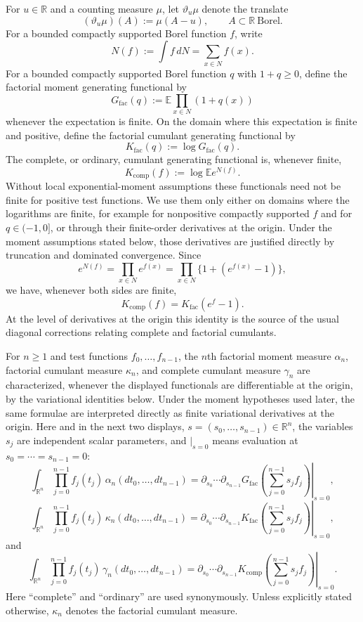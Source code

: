 \documentclass[aap,press]{apt} \volno{00} \partno{00}
\newcommand{\E}{\mathbb{E}}
\newcommand{\R}{\mathbb{R}}
\newcommand{\1}{\mathbf{1}}
\numberwithin{equation}{section}
\begin{document}
For $u\in\R$ and a counting measure $\mu$, let $\vartheta_u\mu$ denote the translate
\[
(\vartheta_u\mu)(A):=\mu(A-u),\qquad A\subset\R\ \text{Borel}.
\]
For a bounded compactly supported Borel function $f$, write
\[
N(f):=\int f\,dN = \sum_{x\in N}f(x) .
\]
For a bounded compactly supported Borel function $q$ with $1+q\ge0$, define the factorial moment generating functional by
\[
G_{\mathrm{fac}}(q)
:=
\E\prod_{x\in N}(1+q(x))
\]
whenever the expectation is finite. On the domain where this expectation is finite and positive, define the factorial cumulant generating functional by
\[
K_{\mathrm{fac}}(q)
:=
\log G_{\mathrm{fac}}(q).
\]
The complete, or ordinary, cumulant generating functional is, whenever finite,
\[
K_{\mathrm{comp}}(f)
:=
\log \E e^{N(f)} .
\]
Without local exponential-moment assumptions these functionals need not be finite for positive test functions. We use them only either on domains where the logarithms are finite, for example for nonpositive compactly supported $f$ and for $q\in(-1,0]$, or through their finite-order derivatives at the origin. Under the moment assumptions stated below, those derivatives are justified directly by truncation and dominated convergence.
Since
\[
e^{N(f)}=\prod_{x\in N} e^{f(x)}=\prod_{x\in N}\{1+(e^{f(x)}-1)\},
\]
we have, whenever both sides are finite,
\begin{equation}\label{eq:ordinary-factorial-generating-functional}
K_{\mathrm{comp}}(f)
=
K_{\mathrm{fac}}(e^f-1).
\end{equation}
At the level of derivatives at the origin this identity is the source of the usual diagonal corrections relating complete and factorial cumulants.

For $n\ge1$ and test functions $f_0,\ldots,f_{n-1}$, the $n$th factorial moment measure $\alpha_n$, factorial cumulant measure $\kappa_n$, and complete cumulant measure $\gamma_n$ are characterized, whenever the displayed functionals are differentiable at the origin, by the variational identities below. Under the moment hypotheses used later, the same formulae are interpreted directly as finite variational derivatives at the origin. Here and in the next two displays,
\(s=(s_0,\ldots,s_{n-1})\in\R^n\), the variables \(s_j\) are
independent scalar parameters, and \(\big|_{s=0}\) means evaluation at
\(s_0=\cdots=s_{n-1}=0\):
\[
\int_{\R^n}\prod_{j=0}^{n-1}f_j(t_j)\,
\alpha_n(dt_0,\ldots,dt_{n-1})
=
\left.
\partial_{s_0}\cdots\partial_{s_{n-1}}
G_{\mathrm{fac}}\!\left(\sum_{j=0}^{n-1}s_jf_j\right)
\right|_{s=0},
\]
\[
\int_{\R^n}\prod_{j=0}^{n-1}f_j(t_j)\,
\kappa_n(dt_0,\ldots,dt_{n-1})
=
\left.
\partial_{s_0}\cdots\partial_{s_{n-1}}
K_{\mathrm{fac}}\!\left(\sum_{j=0}^{n-1}s_jf_j\right)
\right|_{s=0},
\]
and
\[
\int_{\R^n}\prod_{j=0}^{n-1}f_j(t_j)\,
\gamma_n(dt_0,\ldots,dt_{n-1})
=
\left.
\partial_{s_0}\cdots\partial_{s_{n-1}}
K_{\mathrm{comp}}\!\left(\sum_{j=0}^{n-1}s_jf_j\right)
\right|_{s=0}.
\]
Here ``complete'' and ``ordinary'' are used synonymously. Unless explicitly stated otherwise, $\kappa_n$ denotes the factorial cumulant measure.
\end{document}
